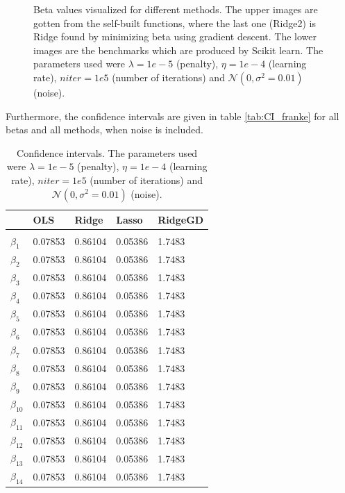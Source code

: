 \begin{figure} [H]
	\caption{Beta values visualized for different methods. The upper images are gotten from the self-built functions, where the last one (Ridge2) is Ridge found by minimizing beta using gradient descent. The lower images are the benchmarks which are produced by Scikit learn. The parameters used were $\lambda=1e-5$ (penalty), $\eta=1e-4$ (learning rate), $niter=1e5$ (number of iterations) and $\mathcal{N}(0, \sigma^2=0.01)$ (noise).}%
	\label{fig:beta_plots}%
\end{figure}

Furthermore, the confidence intervals are given in table \eqref{tab:CI_franke} for all betas and all methods, when noise is included.

\begin{table} [H]
	\caption{Confidence intervals. The parameters used were $\lambda=1e-5$ (penalty), $\eta=1e-4$ (learning rate), $niter=1e5$ (number of iterations) and $\mathcal{N}(0, \sigma^2=0.01)$ (noise).  \vspace{2mm}}
	\begin{tabularx}{\textwidth}{l|XXXX} \hline\hline
		\label{tab:CI_franke}
		&\textbf{OLS}&\textbf{Ridge}&\textbf{Lasso}&\textbf{RidgeGD}\\ \hline \\
		$\beta_1$ & 0.07853 & 0.86104 & 0.05386 & 1.7483\\
		$\beta_2$ & 0.07853 & 0.86104 & 0.05386 & 1.7483\\
		$\beta_3$ & 0.07853 & 0.86104 & 0.05386 & 1.7483\\
		$\beta_4$ & 0.07853 & 0.86104 & 0.05386 & 1.7483\\
		$\beta_5$ & 0.07853 & 0.86104 & 0.05386 & 1.7483\\
		$\beta_6$ & 0.07853 & 0.86104 & 0.05386 & 1.7483\\
		$\beta_7$ & 0.07853 & 0.86104 & 0.05386 & 1.7483\\
		$\beta_8$ & 0.07853 & 0.86104 & 0.05386 & 1.7483\\
		$\beta_9$ & 0.07853 & 0.86104 & 0.05386 & 1.7483\\
		$\beta_{10}$ & 0.07853 & 0.86104 & 0.05386 & 1.7483\\
		$\beta_{11}$ & 0.07853 & 0.86104 & 0.05386 & 1.7483\\
		$\beta_{12}$ & 0.07853 & 0.86104 & 0.05386 & 1.7483\\
		$\beta_{13}$ & 0.07853 & 0.86104 & 0.05386 & 1.7483\\
		$\beta_{14}$ & 0.07853 & 0.86104 & 0.05386 & 1.7483\\

\end{tabularx}
\end{table}
